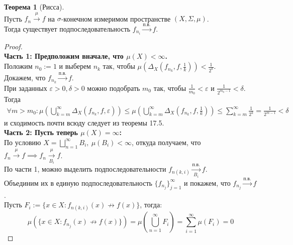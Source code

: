 \documentclass[11pt,a4paper]{report}
\def\eps{\varepsilon}
\theoremstyle{definition}
\theoremstyle{definition}
\newtheorem{theorem}{Теорема}[section]
\theoremstyle{definition}
\begin{document}
		\begin{theorem}[Рисса]$  $\\
			Пусть $ f_{n} \xrightarrow{\mu} f $ на $ \sigma $-конечном измеримом пространстве $ (X, \Sigma, \mu) $.\\ 
			Тогда существует подпоследовательность $ f_{n_{i}} \xrightarrow{п.в.} f $.
		\end{theorem}
		\begin{proof}$  $\\
			\textbf{Часть 1: Предположим вначале, что $ \mu(X) < \infty $.}\\
			Положим $ n_{0} := 1 $ и выберем $ n_{k} $ так, чтобы $ \mu\left (\Delta_{X}\left (f_{n_{k}}, f, \frac{1}{k}\right )\right ) < \frac{1}{2^{k}} $.\\
			Докажем, что $ f_{n_{k}} \xrightarrow{\text{п.в.}} f $.\\
			При заданных $ \eps > 0, \delta > 0 $ можно подобрать $ m_{0} $ так, чтобы $ \frac{1}{m_{0}} < \eps $ и $ \frac{1}{2^{m_{0} - 1}} < \delta $.\\
			Тогда
			\begin{gather*}
				\forall m > m_{0}: \mu\left (\bigcup\limits_{k=m}^{\infty} \Delta_{X}(f_{n_{k}}, f, \eps)\right ) \le \mu\left (\bigcup\limits_{k=m}^{\infty} \Delta_{X}\left (f_{n_{k}}, f, \frac{1}{k}\right )\right ) \le \sum_{k=m}^{\infty}\frac{1}{2^{k}} = \frac{1}{2^{m-1}} < \delta
			\end{gather*}
			и сходимость почти всюду следует из теоремы 17.5.\\
			\textbf{Часть 2: Пусть теперь $ \mu(X) = \infty $:}\\
			По условию $ X = \bigsqcup\limits_{n=1}^{\infty}B_{i},\ \mu(B_{i}) < \infty $, откуда получаем, что $ f_{n} \xrightarrow{\mu} f \implies f_{n} \xrightarrow[B_{i}]{\mu} f $.\\
			По части 1, можно выделить подпоследовательности $ f_{n(k, i)} \xrightarrow[B_{i}]{\text{п.в.}} f $.\\
			Объединим их в единую подпоследовательность $ \{f_{n_{j}}\}_{j=1}^{\infty} $ и покажем, что $ f_{n_{j}} \xrightarrow{п.в.} f $.\\
			Пусть $ F_{i} := \{x \in X: f_{n(k, i)}(x) \not \rightarrow f(x) \}$, тогда: 
			\[ \mu\left ( \{x \in X: f_{n_{j}}(x) \not \rightarrow f(x) \} \right ) = \mu\left (\bigcup\limits_{n=1}^{\infty} F_{i}\right ) = \sum_{i=1}^{\infty} \mu(F_{i}) = 0 \]
		\end{proof}
\end{document}

